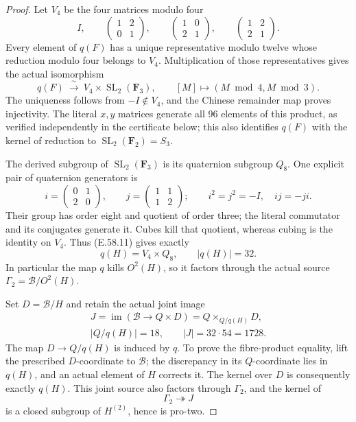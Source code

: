 \begin{proof}
Let \(V_4\) be the four matrices modulo four
\[
 I,\qquad
 \begin{pmatrix}1&2\\0&1\end{pmatrix},\qquad
 \begin{pmatrix}1&0\\2&1\end{pmatrix},\qquad
 \begin{pmatrix}1&2\\2&1\end{pmatrix}.
 \tag{E.58.10}
\]
Every element of \(q(F)\) has a unique representative modulo
twelve whose reduction modulo four belongs to \(V_4\).
Multiplication of those representatives gives the actual
isomorphism
\[
 q(F)\ \xrightarrow{\ \sim\ }\
 V_4\times\operatorname{SL}_2(\mathbf F_3),
 \qquad [M]\longmapsto(M\bmod4,M\bmod3).
 \tag{E.58.11}
\]
The uniqueness follows from \(-I\notin V_4\), and the
Chinese remainder map proves injectivity. The literal
\(x,y\) matrices generate all 96 elements of this product,
as verified independently in the certificate below; this
also identifies \(q(F)\) with the kernel of reduction to
\(\operatorname{SL}_2(\mathbf F_2)=S_3\).

The derived subgroup of \(\operatorname{SL}_2(\mathbf F_3)\)
is its quaternion subgroup \(Q_8\). One explicit pair of
quaternion generators is
\[
 i=\begin{pmatrix}0&1\\2&0\end{pmatrix},\qquad
 j=\begin{pmatrix}1&1\\1&2\end{pmatrix};\qquad
 i^2=j^2=-I,\quad ij=-ji.
 \tag{E.58.12}
\]
Their group has order eight and quotient of order three;
the literal commutator and its conjugates generate it.
Cubes kill that quotient, whereas cubing is the identity
on \(V_4\). Thus \textup{(E.58.11)} gives exactly
\[
                   q(H)=V_4\times Q_8,
                   \qquad |q(H)|=32.
 \tag{E.58.13}
\]
In particular the map \(q\) kills \(O^2(H)\), so it
factors through the actual source
\(\Gamma_2=\mathcal B/O^2(H)\).

Set \(D=\mathcal B/H\) and retain the actual joint image
\[
 \begin{gathered}
 J=\operatorname{im}(\mathcal B\to Q\times D)
       =Q\times_{Q/q(H)}D,\\
 |Q/q(H)|=18,\qquad |J|=32\cdot54=1728.
 \end{gathered}
 \tag{E.58.14}
\]
The map \(D\to Q/q(H)\) is induced by \(q\).
To prove the fibre-product equality, lift the prescribed
\(D\)-coordinate to \(\mathcal B\); the discrepancy in
its \(Q\)-coordinate lies in \(q(H)\), and an actual
element of \(H\) corrects it. The kernel over \(D\)
is consequently exactly \(q(H)\).
This joint source also factors through \(\Gamma_2\),
and the kernel of
\[
                         \Gamma_2\twoheadrightarrow J
 \tag{E.58.15}
\]
is a closed subgroup of \(H^{(2)}\), hence is pro-two.


\end{proof}
